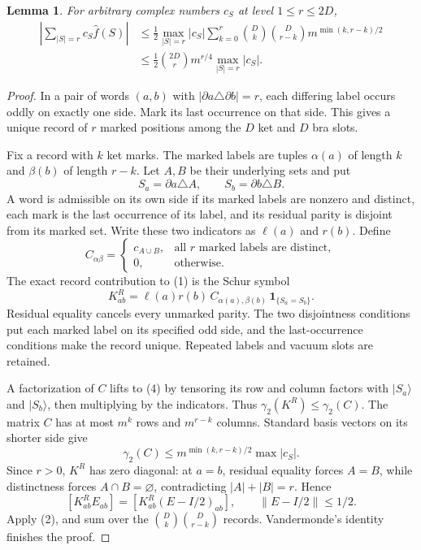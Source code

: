 \documentclass[11pt]{article}
\newtheorem{lemma}[theorem]{Lemma}
\newcommand{\wh}{\widehat}
\begin{document}
\begin{lemma}\label{lem:fourier}
For arbitrary complex numbers $c_S$ at level $1\le r\le2D$,
\[
 \begin{aligned}
 \left|\sum_{|S|=r}c_S\wh f(S)\right|
 &\le \frac12\max_{|S|=r}|c_S|\sum_{k=0}^r {D\choose k}{D\choose r-k}
                  m^{\min(k,r-k)/2}\\
 &\le \frac12{2D\choose r}m^{r/4}\max_{|S|=r}|c_S|.
 \end{aligned}
 \tag{3}
\]
\end{lemma}
\begin{proof}
In a pair of words $(a,b)$ with $|\partial a\triangle\partial b|=r$,
each differing label occurs oddly on exactly one side.
Mark its last occurrence on that side. This gives a unique record
of $r$ marked positions among the $D$ ket and $D$ bra slots.

Fix a record with $k$ ket marks. The marked labels are tuples
$\alpha(a)$ of length $k$ and $\beta(b)$ of length $r-k$.
Let $A,B$ be their underlying sets and put
\[
 S_a=\partial a\triangle A,\qquad S_b=\partial b\triangle B .
\]
A word is admissible on its own side if its marked labels are nonzero
and distinct, each mark is the last occurrence of its label, and its
residual parity is disjoint from its marked set. Write these two
indicators as $\ell(a)$ and $r(b)$. Define
\[
 C_{\alpha\beta}=
 \begin{cases}
 c_{A\cup B},&\text{all $r$ marked labels are distinct},\\
 0,&\text{otherwise}.
 \end{cases}
\]
The exact record contribution to (1) is the Schur symbol
\[
 K^{R}_{ab}=\ell(a)r(b)\,
             C_{\alpha(a),\beta(b)}\,\mathbf1_{\{S_a=S_b\}} .
 \tag{4}
\]
Residual equality cancels every unmarked parity. The two disjointness
conditions put each marked label on its specified odd side, and the
last-occurrence conditions make the record unique.
Repeated labels and vacuum slots are retained.

A factorization of $C$ lifts to (4) by tensoring its row and column
factors with $|S_a\rangle$ and $|S_b\rangle$, then multiplying by
the indicators. Thus $\gamma_2(K^R)\le\gamma_2(C)$.
The matrix $C$ has at most $m^k$ rows and $m^{r-k}$ columns.
Standard basis vectors on its shorter side give
\[
 \gamma_2(C)\le m^{\min(k,r-k)/2}\max|c_S|.
\]
Since $r>0$, $K^R$ has zero diagonal: at $a=b$, residual equality forces
$A=B$, while distinctness forces $A\cap B=\varnothing$, contradicting
$|A|+|B|=r$. Hence
\[
 [K^R_{ab}E_{ab}]=[K^R_{ab}(E-I/2)_{ab}],\qquad
 \|E-I/2\|\le1/2.
\]
Apply (2), and sum over the $ {D\choose k}{D\choose r-k}$ records.
Vandermonde's identity finishes the proof.
\end{proof}
\end{document}
